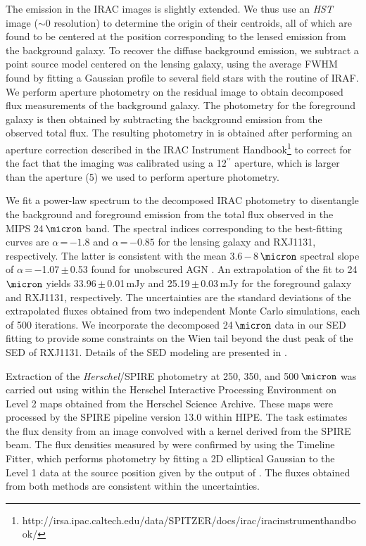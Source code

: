 \documentclass[]{emulateapj}
\begin{document}
The emission in the IRAC images is slightly extended. We thus use an
{\it HST} image ($\sim$0 resolution) to determine the
origin of their centroids, all of which are found to be
centered at the position corresponding to the lensed emission from the
background galaxy. To recover the diffuse background emission, we subtract a
point source model centered on the lensing galaxy, using the average
FWHM found by fitting a Gaussian profile to several field stars
with the  routine of IRAF.
We perform aperture photometry on the residual image
to obtain decomposed flux measurements of the background galaxy.
The photometry for the foreground galaxy is then obtained
by subtracting the background emission from the
observed total flux. The resulting photometry in
 is obtained after performing an aperture correction
described in the IRAC Instrument Handbook\footnote{http://irsa.ipac.caltech.edu/data/SPITZER/docs/irac/iracinstrumenthandbook/} to
correct for the fact that the imaging was calibrated
using a 12$^{\prime\prime}$ aperture, which is larger than the aperture (5) we used to
perform aperture photometry.

We fit a power-law spectrum to the
decomposed IRAC photometry to disentangle the background and foreground
emission from the total flux observed in the MIPS 24\,$\micron$ band.
The spectral indices corresponding to the best-fitting curves are $\alpha$\,=\,$-1.8$ and
$\alpha$\,=\,$-0.85$ for the lensing galaxy and RXJ1131, respectively.
The latter
is consistent with the mean 3.6\,$-$\,8\,$\micron$
spectral slope of
$\alpha$\,=\,$-$1.07\,$\pm$\,0.53 found for unobscured AGN
\citep{Stern05a}. An extrapolation of the fit to 24\,$\micron$
yields 33.96\,$\pm$\,0.01\,mJy and 25.19\,$\pm$\,0.03\,mJy
for the foreground galaxy and RXJ1131, respectively.
The uncertainties are the standard deviations of
the extrapolated fluxes obtained from two independent Monte Carlo
simulations, each of 500 iterations.
We incorporate the decomposed 24\,$\micron$ data in our
SED fitting to provide some constraints on
the Wien tail beyond the dust peak
of the SED of RXJ1131.
Details of the SED modeling are presented in .

Extraction of the {\it Herschel}/SPIRE photometry at 250, 350, and 500\,$\micron$ was
carried out using  within the Herschel Interactive
Processing Environment \citep[HIPE;][]{Ott10a}
on Level 2 maps obtained from the Herschel Science Archive.
These maps were processed by the SPIRE pipeline
version 13.0 within HIPE. The  task estimates
the flux density from an image convolved with a kernel
derived from the SPIRE beam. The flux densities
measured by  were confirmed by
using the Timeline Fitter, which performs photometry
by fitting a 2D elliptical Gaussian to the Level 1 data at the
source position given by the output of . The fluxes
obtained from both methods are consistent within the uncertainties.

\end{document}

